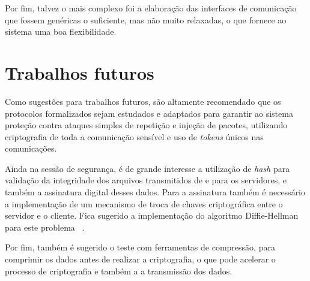     Por fim, talvez o mais complexo foi a elaboração das interfaces de comunicação que fossem genéricas o suficiente, mas não muito relaxadas, o que fornece ao sistema uma boa flexibilidade.
    
    \section{Trabalhos futuros}
    
    Como sugestões para trabalhos futuros, são altamente recomendado que os protocolos formalizados sejam estudados e adaptados para garantir ao sistema proteção contra ataques simples de repetição e injeção de pacotes, utilizando criptografia de toda a comunicação sensível e uso de \textit{tokens} únicos nas comunicações.
    
    Ainda na sessão de segurança, é de grande interesse a utilização de \textit{hash} para validação da integridade dos arquivos transmitidos de e para os servidores, e também a assinatura digital desses dados. Para a assinatura também é necessário a implementação de um mecanismo de troca de chaves criptográfica entre o servidor e o cliente. Fica sugerido a implementação do algoritmo Diffie-Hellman  para este problema ~\cite{merkle1978secure}.
    
    Por fim, também é sugerido o teste com ferramentas de compressão, para comprimir os dados antes de realizar a criptografia, o que pode acelerar o processo de criptografia e também a a transmissão dos dados.